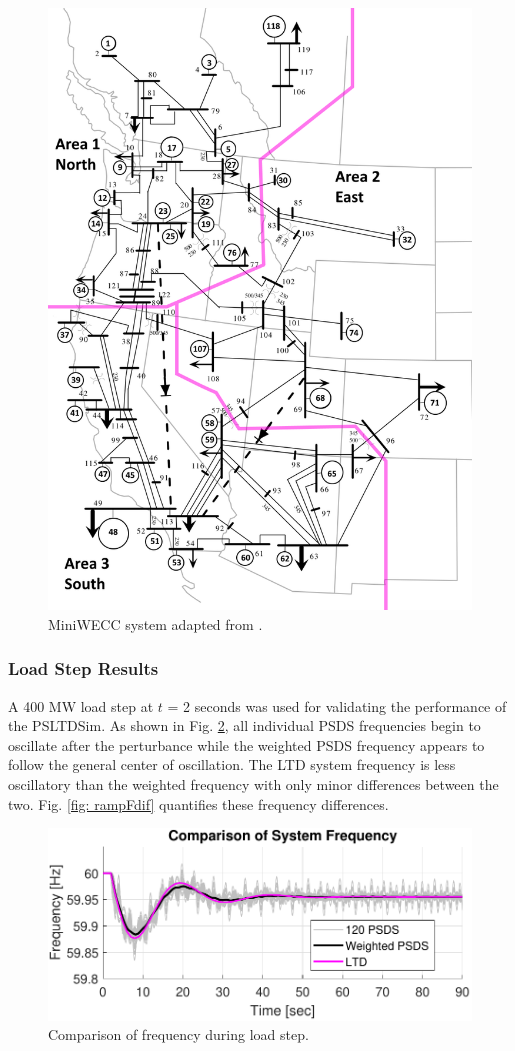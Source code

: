 \begin{figure}[!ht]
	\centering
	\includegraphics[width=.65\linewidth]{figures/miniWECC_split03}
	\caption{MiniWECC system adapted from \cite{RJminiWECC}.}
	\label{fig: miniWECC}
\end{figure}

\subsubsection{Load Step Results}
A 400 MW load step at $t$ = 2 seconds was used for validating the performance of the PSLTDSim.
As shown in Fig. \ref{fig: stepFcomp}, all individual PSDS frequencies begin to oscillate after the perturbance while the weighted PSDS frequency appears to follow the general center of oscillation. The LTD system frequency is less oscillatory than the weighted frequency with only minor differences between the two. Fig. \ref{fig: rampFdif} quantifies these frequency differences.

\begin{figure}[!t]
	\centering
	\includegraphics[width=\linewidth]{figures/miniWECC3ALTDstepF3}
	\caption{Comparison of frequency during load step.}
	\label{fig: stepFcomp}
\end{figure}

